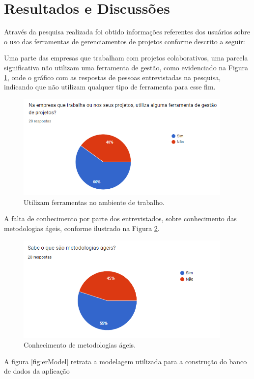 \section{Resultados e Discussões}
Através da pesquisa realizada foi obtido informações referentes dos usuários sobre o uso das ferramentas de gerenciamentos de projetos conforme descrito a seguir:

Uma parte das empresas que trabalham com projetos colaborativos, uma parcela significativa não utilizam uma ferramenta de gestão, como evidenciado na Figura \ref{fig:useOnJob}, onde o gráfico com as respostas de pessoas entrevistadas na pesquisa, indicando que não utilizam qualquer tipo de ferramenta para esse fim.

\begin{figure}[H]
	\centering
	\includegraphics[width=300pt]{img/fig2.png}
	\caption{Utilizam ferramentas no ambiente de trabalho.}
	\label{fig:useOnJob}
\end{figure}

A falta de conhecimento por parte dos entrevistados, sobre conhecimento das metodologias ágeis, conforme ilustrado na Figura \ref{fig:scrumKnowledge}.

\begin{figure}[H]
	\centering
	\includegraphics[width=300pt]{img/fig3.png}
	\caption{Conhecimento de metodologias ágeis.}
	\label{fig:scrumKnowledge}
\end{figure}

A figura \ref{fig:erModel} retrata a modelagem utilizada para a construção do banco de dados da aplicação

